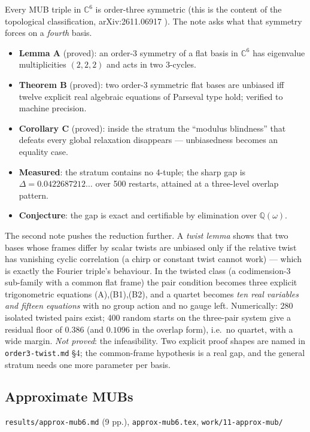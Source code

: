 \documentclass[10pt]{article}
\theoremstyle{definition}
\newcommand{\C}{\mathbb{C}}
\newcommand{\file}[1]{\texttt{\small #1}}
\begin{document}
Every MUB triple in $\C^6$ is order-three symmetric (this is the content of the topological
classification, arXiv:2611.06917 \cite{wuttig26}). The note asks what that symmetry forces on a \emph{fourth} basis.
\begin{itemize}[leftmargin=1.2em,itemsep=1pt]
\item \textbf{Lemma A} (proved): an order-3 symmetry of a flat basis in $\C^6$ has eigenvalue
multiplicities $(2,2,2)$ and acts in two 3-cycles.
\item \textbf{Theorem B} (proved): two order-3 symmetric flat bases are unbiased iff twelve explicit
real algebraic equations of Parseval type hold; verified to machine precision.
\item \textbf{Corollary C} (proved): inside the stratum the ``modulus blindness'' that defeats every
global relaxation disappears --- unbiasedness becomes an equality case.
\item \textbf{Measured}: the stratum contains no 4-tuple; the sharp gap is $\Delta=0.0422687212\dots$
over 500 restarts, attained at a three-level overlap pattern.
\item \textbf{Conjecture}: the gap is exact and certifiable by elimination over $\mathbb{Q}(\omega)$.
\end{itemize}
The second note pushes the reduction further. A \emph{twist lemma} shows that two bases whose frames
differ by scalar twists are unbiased only if the relative twist has vanishing cyclic correlation
(a chirp or constant twist cannot work) --- which is exactly the Fourier triple's behaviour. In the
twisted class (a codimension-3 sub-family with a common flat frame) the pair condition becomes three
explicit trigonometric equations (A),(B1),(B2), and a quartet becomes \emph{ten real variables and
fifteen equations} with no group action and no gauge left. Numerically: 280 isolated twisted pairs
exist; 400 random starts on the three-pair system give a residual floor of $0.386$ (and $0.1096$ in
the overlap form), i.e.\ no quartet, with a wide margin. \emph{Not proved}: the infeasibility. Two
explicit proof shapes are named in \file{order3-\allowbreak{}twist.md} \S4; the common-frame hypothesis is a real
gap, and the general stratum needs one more parameter per basis.

\subsection{Approximate MUBs}\label{sec:approx}
\file{results/\allowbreak{}approx-\allowbreak{}mub6.md} (9 pp.), \file{approx-\allowbreak{}mub6.tex}, \file{work/\allowbreak{}11-\allowbreak{}approx-\allowbreak{}mub/\allowbreak{}}
\end{document}
